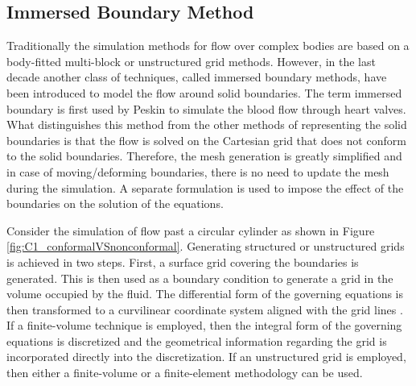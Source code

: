 \subsection{Immersed Boundary Method}
Traditionally the simulation methods for flow over complex bodies are based on a body-fitted multi-block or unstructured grid methods. However, in the last decade another class of techniques, called immersed boundary methods, have been introduced to model the flow around solid boundaries. The term immersed boundary is first used by Peskin \cite{peskin1977numerical} to simulate the blood flow through heart valves. What distinguishes this method from the other methods of representing the solid boundaries is that the flow is solved on the Cartesian grid that does not conform to the solid boundaries. Therefore, the mesh generation is greatly simplified and in case of moving/deforming boundaries, there is no need to update the mesh during the simulation. A separate formulation is used to impose the effect of the boundaries on the solution of the equations.

Consider the simulation of flow past a circular cylinder as shown in Figure \ref{fig:C1_conformalVSnonconformal}. Generating structured or unstructured grids is achieved in two steps. First, a surface grid covering the boundaries is generated. This is then used as a boundary condition to generate a grid in the volume occupied by the fluid. The differential form of the governing equations is then transformed to a curvilinear coordinate system aligned with the grid lines \cite{anderson1995computational}. If a finite-volume technique is employed, then the integral form of the governing equations is discretized and the geometrical information regarding the grid is incorporated directly into the discretization. If an unstructured grid is employed, then either a finite-volume or a finite-element methodology can be used.

